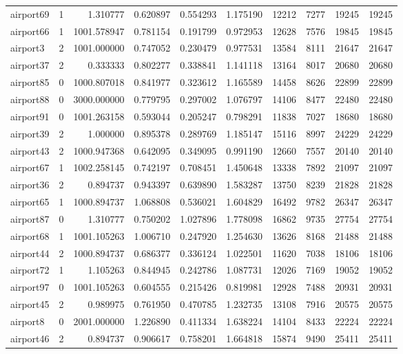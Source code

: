 \begin{longtable}{|l|r|r|r|r|r|r|r|r|r|}
airport69 & 1 & 1.310777 & 0.620897 & 0.554293 & 1.175190 & 12212 & 7277 & 19245 & 19245 \\
airport66 & 1 & 1001.578947 & 0.781154 & 0.191799 & 0.972953 & 12628 & 7576 & 19845 & 19845 \\
airport3 & 2 & 1001.000000 & 0.747052 & 0.230479 & 0.977531 & 13584 & 8111 & 21647 & 21647 \\
airport37 & 2 & 0.333333 & 0.802277 & 0.338841 & 1.141118 & 13164 & 8017 & 20680 & 20680 \\
airport85 & 0 & 1000.807018 & 0.841977 & 0.323612 & 1.165589 & 14458 & 8626 & 22899 & 22899 \\
airport88 & 0 & 3000.000000 & 0.779795 & 0.297002 & 1.076797 & 14106 & 8477 & 22480 & 22480 \\
airport91 & 0 & 1001.263158 & 0.593044 & 0.205247 & 0.798291 & 11838 & 7027 & 18680 & 18680 \\
airport39 & 2 & 1.000000 & 0.895378 & 0.289769 & 1.185147 & 15116 & 8997 & 24229 & 24229 \\
airport43 & 2 & 1000.947368 & 0.642095 & 0.349095 & 0.991190 & 12660 & 7557 & 20140 & 20140 \\
airport67 & 1 & 1002.258145 & 0.742197 & 0.708451 & 1.450648 & 13338 & 7892 & 21097 & 21097 \\
airport36 & 2 & 0.894737 & 0.943397 & 0.639890 & 1.583287 & 13750 & 8239 & 21828 & 21828 \\
airport65 & 1 & 1000.894737 & 1.068808 & 0.536021 & 1.604829 & 16492 & 9782 & 26347 & 26347 \\
airport87 & 0 & 1.310777 & 0.750202 & 1.027896 & 1.778098 & 16862 & 9735 & 27754 & 27754 \\
airport68 & 1 & 1001.105263 & 1.006710 & 0.247920 & 1.254630 & 13626 & 8168 & 21488 & 21488 \\
airport44 & 2 & 1000.894737 & 0.686377 & 0.336124 & 1.022501 & 11620 & 7038 & 18106 & 18106 \\
airport72 & 1 & 1.105263 & 0.844945 & 0.242786 & 1.087731 & 12026 & 7169 & 19052 & 19052 \\
airport97 & 0 & 1001.105263 & 0.604555 & 0.215426 & 0.819981 & 12928 & 7488 & 20931 & 20931 \\
airport45 & 2 & 0.989975 & 0.761950 & 0.470785 & 1.232735 & 13108 & 7916 & 20575 & 20575 \\
airport8 & 0 & 2001.000000 & 1.226890 & 0.411334 & 1.638224 & 14104 & 8433 & 22224 & 22224 \\
airport46 & 2 & 0.894737 & 0.906617 & 0.758201 & 1.664818 & 15874 & 9490 & 25411 & 25411 \\

\end{longtable}
